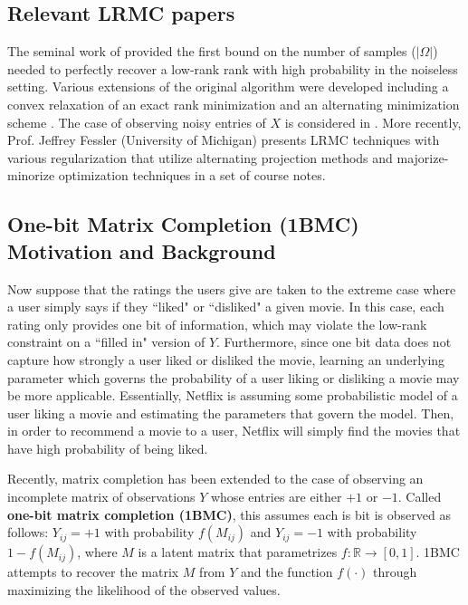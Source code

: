 \subsection{{Relevant LRMC papers}} The seminal work of \cite{candes2009exact} provided the first bound on the number of samples ($|\Omega|$) needed to perfectly recover a low-rank rank with high probability in the noiseless setting. Various extensions of the original algorithm were developed including a convex relaxation of an exact rank minimization \cite{candes2010power} and an alternating minimization scheme \cite{cai2010singular}. The case of observing noisy entries of $X$ is considered in \cite{candes2010matrix}. More recently, Prof. Jeffrey Fessler (University of Michigan) presents LRMC techniques with various regularization that utilize alternating projection methods and majorize-minorize optimization techniques \cite{fessler_2019} in a set of course notes.

\subsection{{One-bit Matrix Completion (1BMC) Motivation and Background}} Now suppose that the ratings the users give are taken to the extreme case where a user simply says if they ``liked" or ``disliked" a given movie. In this case, each rating only provides one bit of information, which may violate the low-rank constraint on a ``filled in" version of $Y$. Furthermore, since one bit data does not capture how strongly a user liked or disliked the movie, learning an underlying parameter which governs the probability of a user liking or disliking a movie may be more applicable. Essentially, Netflix is assuming some probabilistic model of a user liking a movie and estimating the parameters that govern the model. Then, in order to recommend a movie to a user, Netflix will simply find the movies that have high probability of being liked. 

Recently, matrix completion has been extended to the case of observing an incomplete matrix of observations $Y$ whose entries are either $+1$ or $-1$. Called \textbf{one-bit matrix completion (1BMC)}, this assumes each is bit is observed as follows: $Y_{ij} = +1$ with probability $f(M_{ij})$ and $Y_{ij} = -1$ with probability $1 - f(M_{ij})$, where $M$ is a latent matrix that parametrizes $f:\mathbb{R} \rightarrow [0,1]$. 1BMC attempts to recover the matrix $M$ from $Y$ and the function $f(\cdot)$ through maximizing the likelihood of the observed values. 


